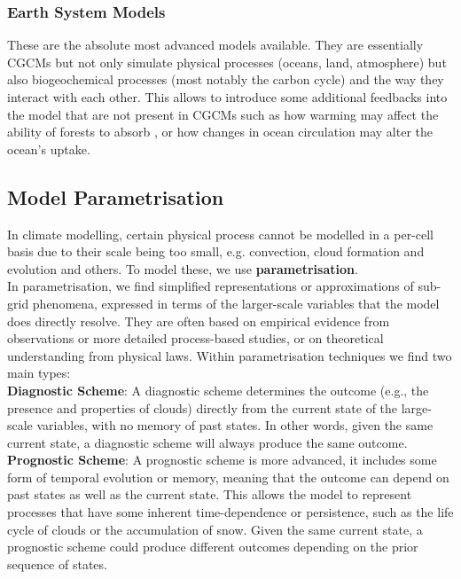 \subsubsection{Earth System Models}
\label{sec:ESMs}

These are the absolute most advanced models available. They are essentially CGCMs
but not only simulate physical processes (oceans, land, atmosphere) but also
biogeochemical processes (most notably the carbon cycle) and the way they interact
with each other. This allows to introduce some additional feedbacks into the model
that are not present in CGCMs such as how warming may affect the ability of forests 
to absorb , or how changes in ocean circulation may alter the ocean's 
 uptake.

\subsection{Model Parametrisation}
\label{sec:model-parametrisation}

In climate modelling, certain physical process cannot be modelled in a per-cell
basis due to their scale being too small, e.g. convection, cloud formation and
evolution and others. To model these, we use \textbf{parametrisation}.\\

In parametrisation, we find simplified 
representations or approximations of sub-grid phenomena, expressed in terms
of the larger-scale variables that the model does directly resolve. They are 
often based on empirical evidence from observations or more detailed process-based 
studies, or on theoretical understanding from physical laws. Within parametrisation
techniques we find two main types:\\

\textbf{Diagnostic Scheme}: A diagnostic scheme determines the outcome (e.g., 
the presence and properties of clouds) directly from the current state of the 
large-scale variables, with no memory of past states. In other words, given the 
same current state, a diagnostic scheme will always produce the same outcome.\\

\textbf{Prognostic Scheme}: A prognostic scheme is more advanced, it includes some 
form of temporal evolution or memory, meaning that the outcome can depend on past 
states as well as the current state. This allows the model to represent processes 
that have some inherent time-dependence or persistence, such as the life cycle of 
clouds or the accumulation of snow. Given the same current state, a prognostic 
scheme could produce different outcomes depending on the prior sequence of states.\\

